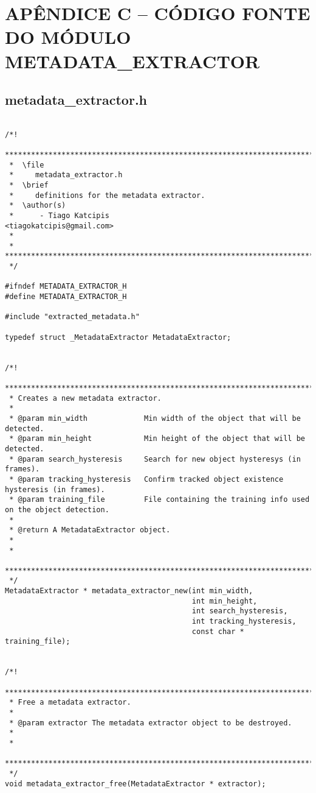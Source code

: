 \chapter{APÊNDICE C -- CÓDIGO FONTE DO MÓDULO METADATA\_EXTRACTOR}


\section{metadata\_extractor.h}

\begin{lstlisting}

/*!
 *******************************************************************************
 *  \file
 *     metadata_extractor.h
 *  \brief
 *     definitions for the metadata extractor.
 *  \author(s)
 *      - Tiago Katcipis                             <tiagokatcipis@gmail.com>
 *
 * *****************************************************************************
 */

#ifndef METADATA_EXTRACTOR_H
#define METADATA_EXTRACTOR_H

#include "extracted_metadata.h"

typedef struct _MetadataExtractor MetadataExtractor;


/*!
 *********************************************************************************
 * Creates a new metadata extractor.  
 *
 * @param min_width             Min width of the object that will be detected.
 * @param min_height            Min height of the object that will be detected.
 * @param search_hysteresis     Search for new object hysteresys (in frames).
 * @param tracking_hysteresis   Confirm tracked object existence hysteresis (in frames).
 * @param training_file         File containing the training info used on the object detection.
 *
 * @return A MetadataExtractor object.
 *
 *
 *********************************************************************************
 */
MetadataExtractor * metadata_extractor_new(int min_width,
                                           int min_height,
                                           int search_hysteresis,
                                           int tracking_hysteresis,
                                           const char * training_file);


/*!
 *********************************************************************************
 * Free a metadata extractor.  
 *
 * @param extractor The metadata extractor object to be destroyed.
 *
 *
 *********************************************************************************
 */
void metadata_extractor_free(MetadataExtractor * extractor);



\end{lstlisting}
